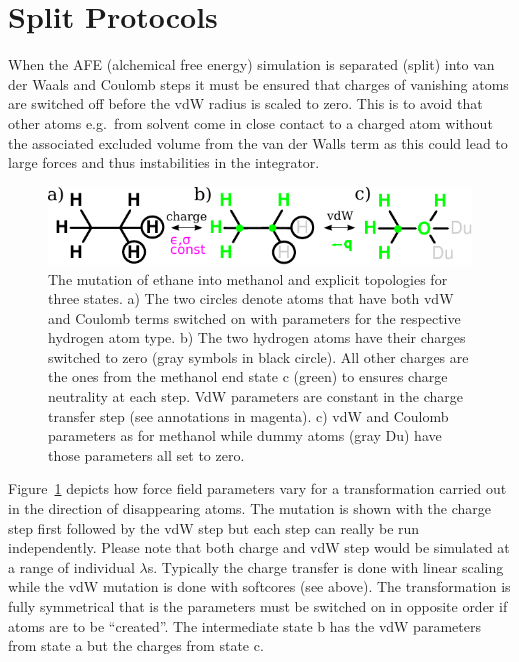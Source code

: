 \documentclass[journal=jctcce,manuscript=suppinfo]{achemso}
\begin{document}
\section{Split Protocols}
\label{sec:separated}

When the AFE (alchemical free energy) simulation is separated (split) into van
der Waals and Coulomb steps it must be ensured that charges of
vanishing atoms are switched off before the vdW radius is scaled to
zero.  This is to avoid that other atoms e.g.\ from solvent come in
close contact to a charged atom without the associated excluded volume
from the van der Walls term as this could lead to large forces and 
thus instabilities in the integrator.

\begin{figure}[ht]
\includegraphics[scale=1.0]{figures/dummies.pdf}
\caption{The mutation of ethane into methanol and explicit topologies
  for three states. a) The two circles denote atoms that have both vdW
  and Coulomb terms switched on with parameters for the respective
  hydrogen atom type.  b) The two hydrogen atoms have their charges
  switched to zero (gray symbols in black circle).  All other charges
  are the ones from the methanol end state c (green) to ensures charge
  neutrality at each step.  VdW parameters are constant in the charge
  transfer step (see annotations in magenta).  c) vdW and Coulomb
  parameters as for methanol while dummy atoms (gray Du) have those
  parameters all set to zero.}
\label{fig:dummies}
\end{figure}

Figure~\ref{fig:dummies} depicts how force field parameters vary for a
transformation carried out in the direction of disappearing atoms.
The mutation is shown with the charge step first followed by the vdW
step but each step can really be run independently.  Please note that
both charge and vdW step would be simulated at a range of individual
$\lambda$s.  Typically the charge transfer is done with linear scaling
while the vdW mutation is done with softcores (see above).  The
transformation is fully symmetrical that is the parameters must be
switched on in opposite order if atoms are to be ``created''.  The
intermediate state b has the vdW parameters from state a but the
charges from state c.
\end{document}
